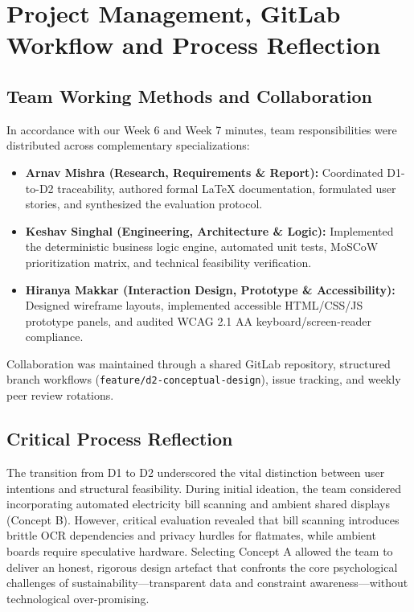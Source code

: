 \documentclass[12pt,a4paper]{article}
\newcommand{\code}[1]{\texttt{#1}}
\begin{document}
\section{Project Management, GitLab Workflow and Process Reflection}

\subsection{Team Working Methods and Collaboration}
In accordance with our Week 6 and Week 7 minutes, team responsibilities were distributed across complementary specializations:
\begin{itemize}[leftmargin=*]
  \item \textbf{Arnav Mishra (Research, Requirements \& Report):} Coordinated D1-to-D2 traceability, authored formal LaTeX documentation, formulated user stories, and synthesized the evaluation protocol.
  \item \textbf{Keshav Singhal (Engineering, Architecture \& Logic):} Implemented the deterministic business logic engine, automated unit tests, MoSCoW prioritization matrix, and technical feasibility verification.
  \item \textbf{Hiranya Makkar (Interaction Design, Prototype \& Accessibility):} Designed wireframe layouts, implemented accessible HTML/CSS/JS prototype panels, and audited WCAG 2.1 AA keyboard/screen-reader compliance.
\end{itemize}
Collaboration was maintained through a shared GitLab repository, structured branch workflows (\code{feature/d2-conceptual-design}), issue tracking, and weekly peer review rotations.

\subsection{Critical Process Reflection}
The transition from D1 to D2 underscored the vital distinction between user intentions and structural feasibility. During initial ideation, the team considered incorporating automated electricity bill scanning and ambient shared displays (Concept B). However, critical evaluation revealed that bill scanning introduces brittle OCR dependencies and privacy hurdles for flatmates, while ambient boards require speculative hardware. Selecting Concept A allowed the team to deliver an honest, rigorous design artefact that confronts the core psychological challenges of sustainability—transparent data and constraint awareness—without technological over-promising.
\end{document}
